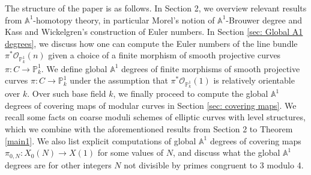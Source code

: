 \documentclass[12pt, reqno]{amsart}
\theoremstyle{definition}
\newcommand{\A}{\mathbb{A}} %
\newcommand{\Proj}{\mathbb{P}} %
\newcommand{\Oh}{\mathscr{O}} %
\begin{document}
The structure of the paper is as follows. In Section 2, we overview relevant results from $\A^1$-homotopy theory, in particular Morel's notion of $\A^1$-Brouwer degree and Kass and Wickelgren's construction of Euler numbers. In Section \ref{sec: Global A1 degrees}, we discuss how one can compute the Euler numbers of the line bundle $\pi^* \Oh_{\Proj^1_k} (n)$ given a choice of a finite morphism of smooth projective curves $\pi: C \to \Proj^1_k$. We define global $\A^1$ degrees of finite morphisms of smooth projective curves $\pi: C \to \Proj^1_k$ under the assumption that $\pi^* \Oh_{\Proj^1_k}(1)$ is relatively orientable over $k$. Over such base field $k$, we finally proceed to compute the global $\A^1$ degrees of covering maps of modular curves in Section \ref{sec: covering maps}. We recall some facts on coarse moduli schemes of elliptic curves with level structures, which we combine with the aforementioned results from Section 2 to Theorem \ref{main1}. We also list explicit computations of global $\A^1$ degrees of covering maps $\pi_{0,N}:X_0(N) \to X(1)$ for some values of $N$, and discuss what the global $\A^1$ degrees are for other integers $N$ not divisible by primes congruent to 3 modulo 4.
\end{document}

